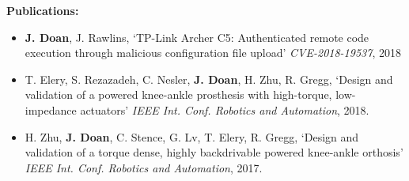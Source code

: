 \textbf{Publications:}
\begin{itemize} 
	\item \textbf{J. Doan}, J. Rawlins, `TP-Link Archer C5: Authenticated remote code execution through malicious configuration file upload' \textit{CVE-2018-19537}, 2018
	\item T. Elery, S. Rezazadeh, C. Nesler, \textbf{J. Doan}, H. Zhu, R. Gregg, `Design and validation of a powered knee-ankle prosthesis with high-torque, low-impedance actuators' \textit{IEEE Int. Conf. Robotics and Automation}, 2018.
	\item H. Zhu, \textbf{J. Doan}, C. Stence, G. Lv, T. Elery, R. Gregg, `Design and validation of a     torque dense, highly backdrivable powered knee-ankle orthosis' \textit{IEEE Int. Conf. Robotics and Automation}, 2017.
\end{itemize}

